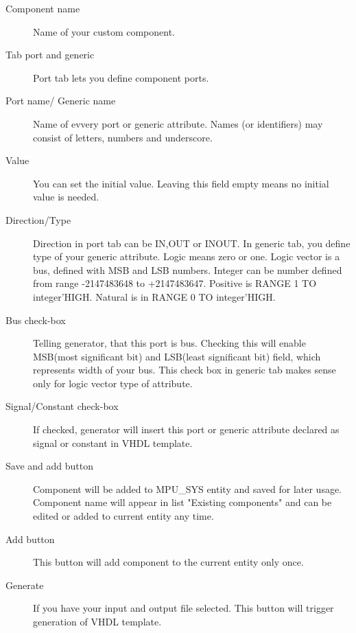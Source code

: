     \begin{description}
        \item [Component name]
            Name of your custom component.
        \item [Tab port and generic]
            Port tab lets you define component ports.
        \item [Port name/ Generic name]
            Name of evvery port or generic attribute. Names (or identifiers) may consist of letters, numbers and underscore.
        \item [Value]
            You can set the initial value. Leaving this field empty means no initial value is needed.
        \item [Direction/Type]
            Direction in port tab can be IN,OUT or INOUT. In generic tab, you define type of your generic attribute. Logic means zero or one. Logic vector is a bus, defined with MSB and LSB numbers.
            Integer can be number defined from range -2147483648 to +2147483647. Positive is RANGE 1 TO integer’HIGH. Natural is in RANGE 0 TO integer’HIGH.
        \item [Bus check-box]
            Telling generator, that this port is bus. Checking this will enable MSB(most significant bit) and LSB(least significant bit) field, which represents width of your bus.
            This check box in generic tab makes sense only for logic vector type of attribute.
        \item [Signal/Constant check-box]
            If checked, generator will insert this port or generic attribute declared as signal or constant in VHDL template.
        \item [Save and add button]
            Component will be added to MPU\_SYS entity and saved for later usage. Component name will appear in list "Existing components" and can be edited or added to current entity any time.
        \item [Add button]
            This button will add component to the current entity only once.
        \item [Generate]
            If you have your input and output file selected. This button will trigger generation of VHDL template.\\
    \end{description}
    